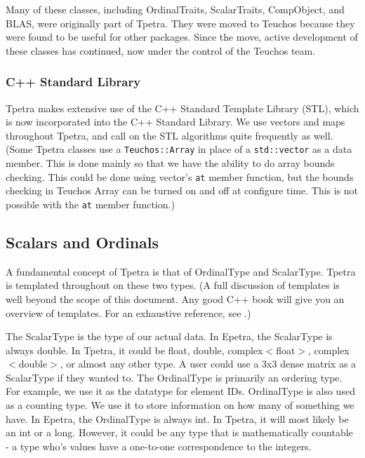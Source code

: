 \documentclass[10pt,relax]{TpetraDesign}
\begin{document}
Many of these classes, including OrdinalTraits, ScalarTraits, CompObject, and BLAS, were originally part of Tpetra. They were moved to Teuchos because they were found to be useful for other packages. Since the move, active development of these classes has continued, now under the control of the Teuchos team.

\subsubsection*{C++ Standard Library}
Tpetra makes extensive use of the C++ Standard Template Library (STL), which is now incorporated into the C++ Standard Library. We use vectors and maps throughout Tpetra, and call on the STL algorithms quite frequently as well. (Some Tpetra classes use a \texttt{Teuchos::Array} in place of a \texttt{std::vector} as a data member. This is done mainly so that we have the ability to do array bounds checking. This could be done using vector's \texttt{at} member function, but the bounds checking in Teuchos Array can be turned on and off at configure time. This is not possible with the \texttt{at} member function.)

%
\subsection{Scalars and Ordinals}
A fundamental concept of Tpetra is that of OrdinalType and ScalarType. Tpetra is templated throughout on these two types. (A full discussion of templates is well beyond the scope of this document. Any good C++ book will give you an overview of templates. For an exhaustive reference, see \cite{Templates-Complete-Guide}.)

The ScalarType is the type of our actual data. In Epetra, the ScalarType is always double. In Tpetra, it could be float, double, complex$<$float$>$, complex$<$double$>$, or almost any other type. A user could use a 3x3 dense matrix as a ScalarType if they wanted to. The OrdinalType is primarily an ordering type. For example, we use it as the datatype for element IDs. OrdinalType is also used as a counting type. We use it to store information on how many of something we have. In Epetra, the OrdinalType is always int. In Tpetra, it will most likely be an int or a long. However, it could be any type that is mathematically countable - a type who's values have a one-to-one correspondence to the integers.
\end{document}
